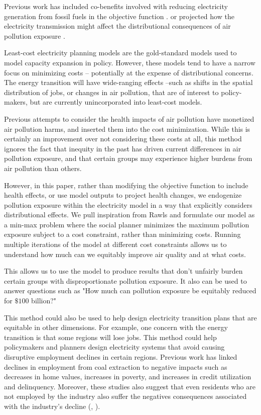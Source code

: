 \documentclass[a4paper]{article}
\theoremstyle{definition}
\theoremstyle{plain}
\begin{document}
Previous work has included co-benefits involved with reducing electricity generation from fossil fuels in the objective function \citet{Sergi2020OptimizingBenefits}.
or projected how the electricity transmission might affect the distributional consequences of air pollution exposure \citep{Goforth2022AirStrategies}. 

Least-cost electricity planning models are the gold-standard models used to model capacity expansion in policy.  However, these models tend to have a narrow focus on minimizing costs -- potentially at the expense of distributional concerns.  The energy transition will have wide-ranging effects --such as shifts in the spatial distribution of jobs, or changes in air pollution, that are of interest to policy-makers, but are currently unincorporated into least-cost models.

Previous attempts to consider the health impacts of air pollution have monetized air pollution harms, and inserted them into the cost minimization.  While this is certainly an improvement over not considering these costs at all, this method ignores the fact that inequity in the past has driven current differences in air pollution exposure, and that certain groups may experience higher burdens from air pollution than others.

However, in this paper, rather than modifying the objective function to include health effects, or use model outputs to project health changes, we endogenize pollution exposure within the electricity model in a way that explicitly considers distributional effects.  We pull inspiration from Rawls and formulate our model as a min-max problem where the social planner minimizes the maximum pollution exposure subject to a cost constraint, rather than minimizing costs.  Running multiple iterations of the model at different cost constraints allows us to understand how much can we equitably improve air quality and at what costs.

This allows us to use the model to produce results that don't unfairly burden certain groups with disproportionate pollution exposure.  It also can be used to answer questions such as "How much can pollution exposure be equitably reduced for $\$100$ billion?" 

This method could also be used to help design electricity transition plans that are equitable in other dimensions.  For example, one concern with the energy transition is that some regions will lose jobs.  This method could help policymakers and planners design electricity systems that avoid causing disruptive employment declines in certain regions. Previous work has linked declines in employment from  coal extraction to negative impacts such as decreases in home values, increases in poverty, and increases in credit utilization and delinquency. Moreover, these studies also suggest that even residents who are not employed by the industry also suffer the negatives consequences associated with the industry's decline (\citet{Kraynak2023TheCountry}, \citet{Blonz2023TheFuels}). 
\end{document}

